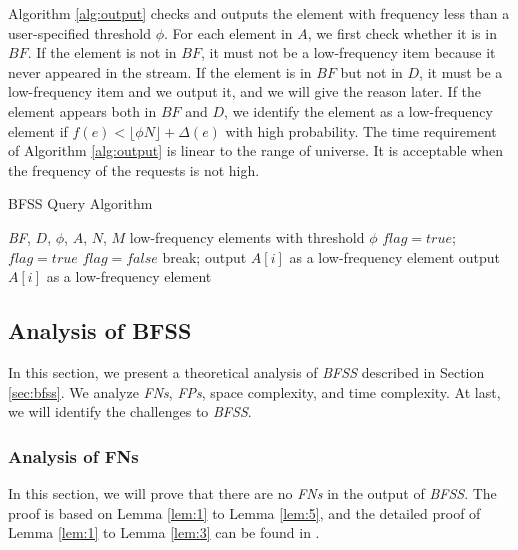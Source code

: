 \documentclass[conference]{IEEEtran}
\begin{document}
Algorithm \ref{alg:output} checks and outputs the element with frequency less than a user-specified threshold $\phi$. For each element in $A$, we first check whether it is in $BF$. If the element is not in $BF$, it must not be a low-frequency item because it never appeared in the stream. If the element is in $BF$ but not in $D$, it must be a low-frequency item and we output it, and we will give the reason later. If the element appears both in $BF$ and $D$, we identify the element as a low-frequency element if $f(e)<\lfloor \phi N\rfloor+\Delta(e)$ with high probability. The time requirement of Algorithm \ref{alg:output} is linear to the range of universe. It is acceptable when the frequency of the requests is not high. 

\begin{algorithm}[h]
	\caption{BFSS Query Algorithm}
	\label{alg:output}
	\begin{algorithmic}[1]
		\REQUIRE \emph{BF}, $D$, $\phi$, $A$, $N$, $M$
		\ENSURE low-frequency elements with threshold $\phi$
		\STATE $flag=true$; 
		\STATE $flag=true$
		\STATE $flag=false$
		\STATE break;
		\ENDIF
		\ENDFOR
		\STATE output $A[i]$ as a low-frequency element
		\ENDIF
		\ELSE
		\STATE output $A[i]$ as a low-frequency element
		\ENDIF
		\ENDIF
		\ENDFOR
	\end{algorithmic}
\end{algorithm}
\subsection{Analysis of BFSS}
In this section, we present a theoretical analysis of \emph{BFSS} described in Section \ref{sec:bfss}. We analyze \emph{FNs}, \emph{FPs}, space complexity, and time complexity. At last, we will identify the challenges to \emph{BFSS}. \par

\subsubsection{\textbf{Analysis of FNs}}
In this section, we will prove that there are no \emph{FNs} in the output of \emph{BFSS}. The proof is based on Lemma \ref{lem:1} to Lemma \ref{lem:5}, and the detailed proof of Lemma \ref{lem:1} to Lemma \ref{lem:3} can be found in \cite{IEEEexample:spacesaving}.\par
\end{document}

